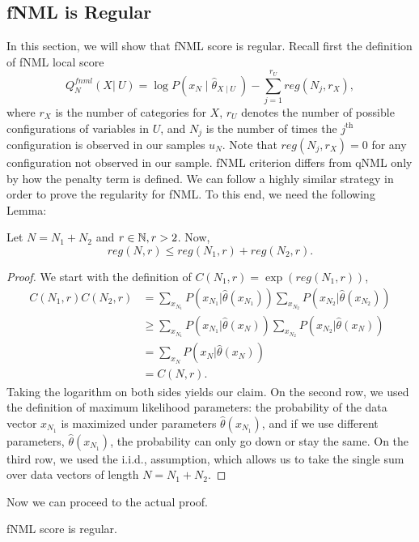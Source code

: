 \subsection{fNML is Regular}
In this section, we will show that fNML score is regular. Recall first the definition of fNML local score
\begin{equation}
Q^{fnml}_N(X  \vert \ U) = \log P(x_N \mid \hat{\theta}_{X\mid U} \ ) - \sum_{j = 1}^{r_U} reg(N_j,r_X),
\end{equation}where $r_X$ is the number of categories for $X$, $r_U$ denotes the number of possible configurations of variables in $U$, and $N_j$ is the number of times the $j^\text{th}$ configuration is observed in our samples $u_N$. Note that $reg(N_j,r_X) = 0$ for any configuration not observed in our sample. 
fNML criterion differs from qNML only by how the penalty term is defined. We can follow a highly similar strategy in order to prove the regularity for fNML. To this end, we need the following Lemma:
\begin{lemma}\label{regineq}
Let $N = N_1 + N_2$ and $r \in\mathbb{N}, r > 2$. Now,
$$
reg(N,r) \leq reg(N_1,r) + reg(N_2,r).
$$
\end{lemma}
\begin{proof}
We start with the definition of $C(N_1,r) = \exp(reg(N_1,r))$,
\begin{align*}
C(N_1,r)C(N_2,r) &= \sum_{x_{N_1}}P(x_{N_1} \vert \hat{\theta}(x_{N_1} ))\sum_{x_{N_2}}P(x_{N_2} \vert \hat{\theta}(x_{N_2} ))\\ & \geq
\sum_{x_{N_1}}P(x_{N_1} \vert \hat{\theta}(x_{N} ))\sum_{x_{N_2}}P(x_{N_2} \vert \hat{\theta}(x_{N} )) \\ &=
\sum_{x_{N}}P(x_{N} \vert \hat{\theta}(x_{N} )) \\ & = C(N,r).
\end{align*}Taking the logarithm on both sides yields our claim. On the second row, we used the definition of maximum likelihood parameters: the probability of the data vector $x_{N_1}$ is maximized under parameters $\hat{\theta}(x_{N_1})$, and if we use different parameters, $\hat{\theta}(x_{N_1})$, the probability can only go down or stay the same. On the third row, we used the i.i.d., assumption, which allows us to take the single sum over data vectors of length $N = N_1 + N_2$.
\end{proof}
Now we can proceed to the actual proof.
\begin{theorem}
fNML score is regular.
\end{theorem}
